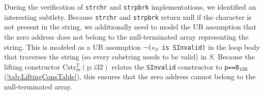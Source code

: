 During the verification of {\tt strchr} and {\tt strpbrk} implementations,
we identified an interesting subtlety. Because {\tt strchr} and {\tt strpbrk}
return null if the character is
not present in the string, we additionally need to model the UB assumption that the zero
address does not belong to the null-terminated array representing the string. This
is modeled as a UB assumption $\neg${\tt ($s_S$ is SInvalid)} in the loop body that traverses the string
(so every substring needs to be valid) in $S$.
Because the lifting constructor
$\mathrm{Cstr^{T}_m(p:i32)}$ relates the {\tt SInvalid} constructor to {\tt p==0$_{\tt i32}$} (\cref{tab:LiftingConsTable}),
this ensures that the zero address cannot belong to the null-terminated array.